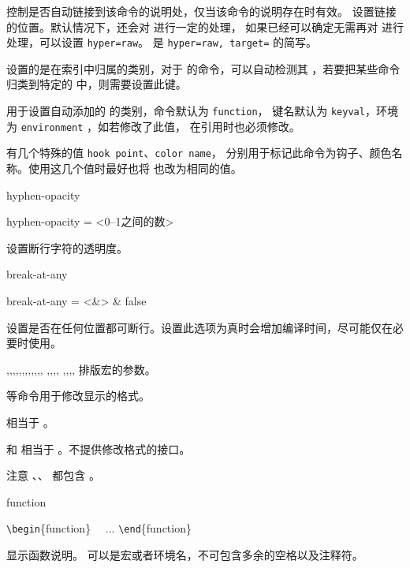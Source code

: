 \documentclass{cusdoc}
\begin{document}
 控制是否自动链接到该命令的说明处，仅当该命令的说明存在时有效。
 设置链接的位置。默认情况下，还会对  进行一定的处理，
如果已经可以确定无需再对  进行处理，可以设置 \verb|hyper=raw|。
 是 \verb|hyper=raw, target=| 的简写。

 设置的是在索引中归属的类别，对于 \LaTeXiii 的命令，可以自动检测其 
，若要把某些命令归类到特定的  中，则需要设置此键。

 用于设置自动添加的  的类别，命令默认为 \texttt{function}，
键名默认为 \texttt{keyval}，环境为 \texttt{environment} ，如若修改了此值，
在引用时也必须修改。

 有几个特殊的值 \verb*|hook point|、\verb*|color name|，
分别用于标记此命令为钩子、颜色名称。使用这几个值时最好也将  也改为相同的值。

\begin{keyval}[path=doc/cmd]{hyphen-opacity}
  \begin{syntax}
    hyphen-opacity = <{0--1之间的数}>
  \end{syntax}
设置断行字符的透明度。
\end{keyval}

\begin{keyval}[path=doc/cmd]{break-at-any}
  \begin{syntax}
    break-at-any = <&\TTF> & false 
  \end{syntax}
设置是否在任何位置都可断行。设置此选项为真时会增加编译时间，尽可能仅在必要时使用。
\end{keyval}

\begin{function}{\meta,\veta,\marg,\Arg,\oarg,\parg,\pkg,\env,\cls,\opt,\file,\docfile,
  \cus@doc@meta@format,\cus@doc@veta@format,\cus@doc@marg@format,\cus@doc@oarg@format,
  \cus@doc@parg@format,\cus@doc@pkg@format,\cus@doc@env@format,\cus@doc@cls@format,\cus@doc@opt@format} 
排版宏的参数。

 等命令用于修改显示的格式。

 相当于 。

 和  相当于 。不提供修改格式的接口。

注意 、、 都包含 。
\end{function}

\begin{function}[type=environment]{function}
\begin{syntax}
  \verb|\begin|\{function\}  
  ~~... 
  \verb|\end|\{function\}
\end{syntax}
显示函数说明。 可以是宏或者环境名，不可包含多余的空格以及注释符。
\end{function}
\end{document}
